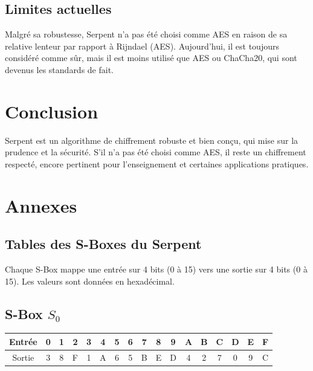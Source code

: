\documentclass[12pt,a4paper]{report}
\begin{document}
\subsection{Limites actuelles}

Malgré sa robustesse, Serpent n’a pas été choisi comme AES en raison de sa relative lenteur par rapport à Rijndael (AES).  
Aujourd’hui, il est toujours considéré comme sûr, mais il est moins utilisé que AES ou ChaCha20, qui sont devenus les standards de fait.

\section*{Conclusion}

Serpent est un algorithme de chiffrement robuste et bien conçu, qui mise sur la prudence et la sécurité.  
S’il n’a pas été choisi comme AES, il reste un chiffrement respecté, encore pertinent pour l’enseignement et certaines applications pratiques.









\section*{Annexes}

\setcounter{subsection}{0}

\subsection{Tables des S-Boxes du Serpent}

Chaque S-Box mappe une entrée sur 4 bits (0 à 15) vers une sortie sur 4 bits (0 à 15).  
Les valeurs sont données en hexadécimal.

\subsection*{S-Box $S_0$}
\begin{center}
\begin{tabular}{|c|cccccccccccccccc|}
\hline
Entrée & 0 & 1 & 2 & 3 & 4 & 5 & 6 & 7 & 8 & 9 & A & B & C & D & E & F \\
\hline
Sortie & 3 & 8 & F & 1 & A & 6 & 5 & B & E & D & 4 & 2 & 7 & 0 & 9 & C \\
\hline
\end{tabular}
\end{center}
\end{document}
